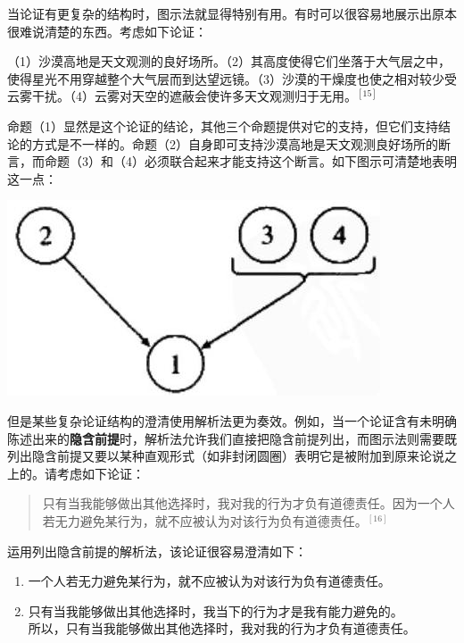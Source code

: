 当论证有更复杂的结构时，图示法就显得特别有用。有时可以很容易地展示出原本很难说清楚的东西。考虑如下论证：

\begin{displayquote}
（1）沙漠高地是天文观测的良好场所。（2）其高度使得它们坐落于大气层之中，使得星光不用穿越整个大气层而到达望远镜。（3）沙漠的干燥度也使之相对较少受云雾干扰。（4）云雾对天空的遮蔽会使许多天文观测归于无用。${}^{[15]}$
\end{displayquote}

命题（1）显然是这个论证的结论，其他三个命题提供对它的支持，但它们支持结论的方式是不一样的。命题（2）自身即可支持沙漠高地是天文观测良好场所的断言，而命题（3）和（4）必须联合起来才能支持这个断言。如下图示可清楚地表明这一点：

\begin{center}
\includegraphics[width=\textwidth]{images/2025_05_15_6a28331d5e7c993ad07ag-031.jpg}
\end{center}

但是某些复杂论证结构的澄清使用解析法更为奏效。例如，当一个论证含有未明确陈述出来的\textbf{隐含前提}时，解析法允许我们直接把隐含前提列出，而图示法则需要既列出隐含前提又要以某种直观形式（如非封闭圆圈）表明它是被附加到原来论说之上的。请考虑如下论证：

\begin{quotation}
只有当我能够做出其他选择时，我对我的行为才负有道德责任。因为一个人若无力避免某行为，就不应被认为对该行为负有道德责任。${}^{[16]}$
\end{quotation}

运用列出隐含前提的解析法，该论证很容易澄清如下：

\begin{enumerate}
  \item 一个人若无力避免某行为，就不应被认为对该行为负有道德责任。
  \item 只有当我能够做出其他选择时，我当下的行为才是我有能力避免的。\\
  所以，只有当我能够做出其他选择时，我对我的行为才负有道德责任。
\end{enumerate}


